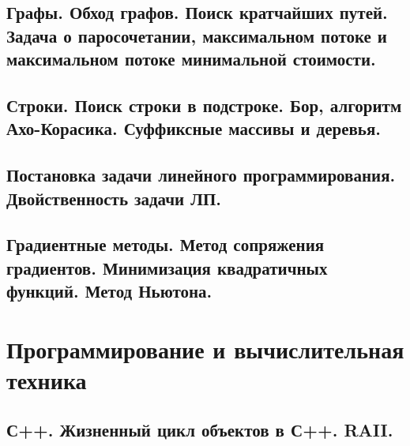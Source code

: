 \documentclass{article}
\begin{document}
\subsection{Графы. Обход графов. Поиск кратчайших путей. Задача о паросочетании, максимальном потоке и максимальном потоке минимальной стоимости.}

\subsection{Строки. Поиск строки в подстроке. Бор, алгоритм Ахо-Корасика. Суффиксные массивы и деревья.}

\subsection{Постановка задачи линейного программирования. Двойственность задачи ЛП.}

\subsection{Градиентные методы. Метод сопряжения градиентов. Минимизация квадратичных функций. Метод Ньютона.}

\newpage

\section{Программирование и вычислительная техника}







\subsection{С++. Жизненный цикл объектов в С++. RAII.}




































\end{document}
